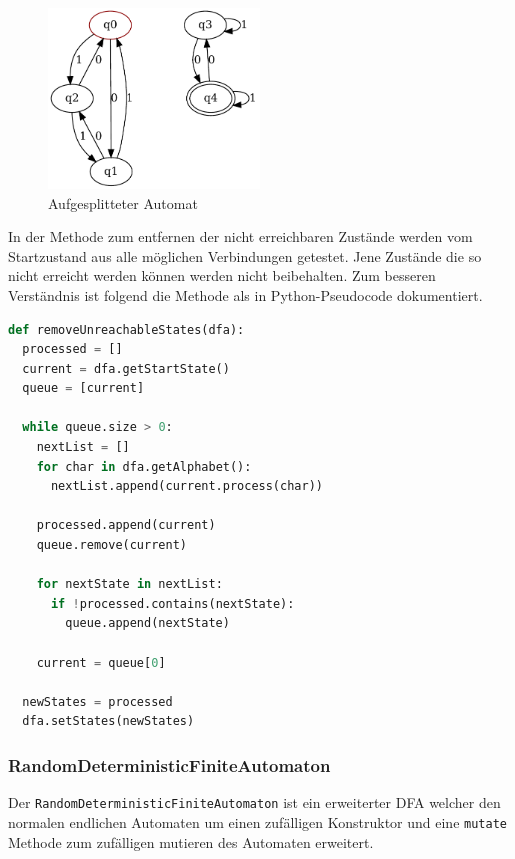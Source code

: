 \begin{figure}[H]
  \centering
  \includegraphics[width=0.5\textwidth]{images/split_automaton.pdf}
  \caption[Aufgesplitteter Automat]{Aufgesplitteter Automat}
  \label{fig:split_dfa}
\end{figure}

In der Methode zum entfernen der nicht erreichbaren Zustände werden vom Startzustand aus alle möglichen Verbindungen getestet. Jene Zustände die so nicht erreicht werden können werden nicht beibehalten. Zum besseren Verständnis ist folgend die Methode als in Python-Pseudocode dokumentiert.  

\begin{lstlisting}[language=Python, caption={Algorithmus zum entfernen von nicht erreichbaren Zuständen}, label={lst:remove_unreachable_states}]
def removeUnreachableStates(dfa):
  processed = []
  current = dfa.getStartState()
  queue = [current]
  
  while queue.size > 0:
    nextList = []
    for char in dfa.getAlphabet():
      nextList.append(current.process(char))

    processed.append(current)
    queue.remove(current)

    for nextState in nextList:
      if !processed.contains(nextState):
        queue.append(nextState)

    current = queue[0]

  newStates = processed
  dfa.setStates(newStates)
\end{lstlisting}

\subsubsection{RandomDeterministicFiniteAutomaton}
\label{subsec:RandomDeterministicFiniteAutomaton}
Der \lstinline$RandomDeterministicFiniteAutomaton$ ist ein erweiterter DFA welcher den normalen endlichen Automaten um einen zufälligen Konstruktor und eine \lstinline$mutate$ Methode zum zufälligen mutieren des Automaten erweitert.

